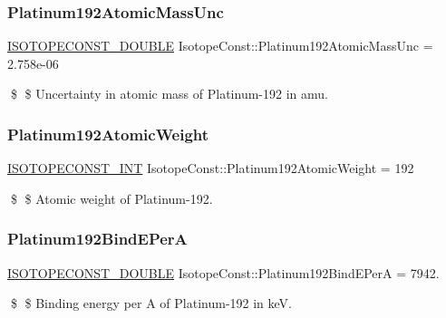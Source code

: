 \subsubsection{\texorpdfstring{Platinum192\+Atomic\+Mass\+Unc}{Platinum192AtomicMassUnc}}
{\footnotesize\ttfamily \mbox{\hyperlink{group___isotope_const-_macros_ga8f45a7272ce02c0b4c65c44636ed719a}{I\+S\+O\+T\+O\+P\+E\+C\+O\+N\+S\+T\+\_\+\+D\+O\+U\+B\+LE}} Isotope\+Const\+::\+Platinum192\+Atomic\+Mass\+Unc = 2.\+758e-\/06}

\$ \$ Uncertainty in atomic mass of Platinum-\/192 in amu. \mbox{\label{group___isotope_const-_platinum-_pt192_ga593defed1457669d1988b1de99fdb322}} 
\subsubsection{\texorpdfstring{Platinum192\+Atomic\+Weight}{Platinum192AtomicWeight}}
{\footnotesize\ttfamily \mbox{\hyperlink{group___isotope_const-_macros_ga5f18360b3e99483a35c32d789e62621c}{I\+S\+O\+T\+O\+P\+E\+C\+O\+N\+S\+T\+\_\+\+I\+NT}} Isotope\+Const\+::\+Platinum192\+Atomic\+Weight = 192}

\$ \$ Atomic weight of Platinum-\/192. \mbox{\label{group___isotope_const-_platinum-_pt192_gaf82d89b9f396abeb7baa96bccf661cc7}} 
\subsubsection{\texorpdfstring{Platinum192\+Bind\+E\+PerA}{Platinum192BindEPerA}}
{\footnotesize\ttfamily \mbox{\hyperlink{group___isotope_const-_macros_ga8f45a7272ce02c0b4c65c44636ed719a}{I\+S\+O\+T\+O\+P\+E\+C\+O\+N\+S\+T\+\_\+\+D\+O\+U\+B\+LE}} Isotope\+Const\+::\+Platinum192\+Bind\+E\+PerA = 7942.}

\$ \$ Binding energy per A of Platinum-\/192 in keV. \mbox{\label{group___isotope_const-_platinum-_pt192_ga332bc35b1b4feddd9b02766975bf294d}} 
